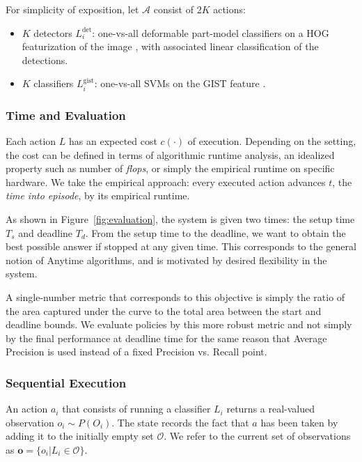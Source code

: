 For simplicity of exposition, let $\mathcal{A}$ consist of $2K$ actions:
\begin{itemize}
  \item $K$ detectors $L^\text{det}_i$: one-vs-all deformable part-model classifiers on a HOG featurization of the image \cite{Felzenszwalb2010a}, with associated linear classification of the detections.
  \item $K$ classifiers $L^\text{gist}_i$: one-vs-all SVMs on the GIST feature \cite{Torralba2004}.
\end{itemize}

\subsubsection{Time and Evaluation}
Each action $L$ has an expected cost $c(\cdot)$ of execution.
Depending on the setting, the cost can be defined in terms of algorithmic runtime analysis, an idealized property such as number of \emph{flops}, or simply the empirical runtime on specific hardware.
We take the empirical approach: every executed action advances $t$, the \emph{time into episode}, by its empirical runtime.

As shown in Figure~\ref{fig:evaluation}, the system is given two times: the setup time $T_s$ and deadline $T_d$.
From the setup time to the deadline, we want to obtain the best possible answer if stopped at any given time.
This corresponds to the general notion of Anytime algorithms, and is motivated by desired flexibility in the system.

A single-number metric that corresponds to this objective is simply the ratio of the area captured under the curve to the total area between the start and deadline bounds.
We evaluate policies by this more robust metric and not simply by the final performance at deadline time for the same reason that Average Precision is used instead of a fixed Precision vs. Recall point.

\subsubsection{Sequential Execution}
An action $a_i$ that consists of running a classifier $L_i$ returns a real-valued observation $o_i \sim P(O_i)$.
The state records the fact that $a$ has been taken by adding it to the initially empty set $\mathcal{O}$.
We refer to the current set of observations as $\mathbf{o} = \{o_i | L_i \in \mathcal{O}\}$.

